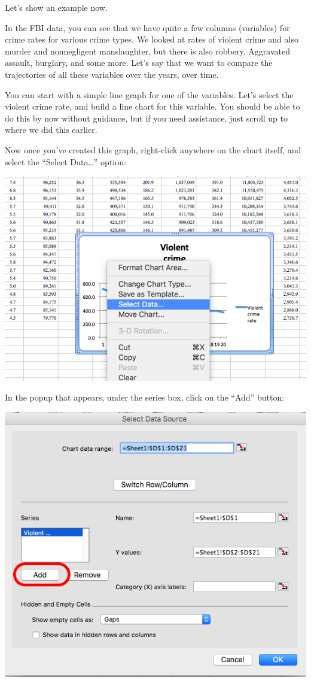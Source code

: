 \documentclass[
]{book}
\begin{document}
Let's show an example now.

In the FBI data, you can see that we have quite a few columns (variables) for crime rates for various crime types. We looked at rates of violent crime and also murder and nonnegligent manslaughter, but there is also robbery, Aggravated assault, burglary, and some more. Let's say that we want to compare the trajectories of all these variables over the years, over time.

You can start with a simple line graph for one of the variables. Let's select the violent crime rate, and build a line chart for this variable. You should be able to do this by now without guidance, but if you need assistance, just scroll up to where we did this earlier.

Now once you've created this graph, right-click anywhere on the chart itself, and select the ``Select Data\ldots{}'' option:

\includegraphics{imgs/comp_c_1.png}

In the popup that appears, under the series box, click on the ``Add'' button:

\includegraphics{imgs/comp_c_2.png}
\end{document}
